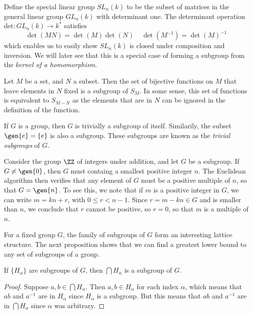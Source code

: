 \begin{example}
    Define the special linear group $SL_n(k)$ to be the subset of matrices in the general linear group $GL_n(k)$ with determinant one. The determinant operation $\text{det}: GL_n(k) \to k^*$ satisfies
    \[ \det(MN) = \det(M) \det(N)\ \ \ \ \ \det(M^{-1}) = \det(M)^{-1} \]
    which enables us to easily show $SL_n(k)$ is closed under composition and inversion. We will later see that this is a special case of forming a subgroup from the {\it kernel of a homomorphism}.
\end{example}

\begin{example}
    Let $M$ be a set, and $N$ a subset. Then the set of bijective functions on $M$ that leave elements in $N$ fixed is a subgroup of $S_M$. In some sense, this set of functions is equivalent to $S_{M - N}$ as the elements that are in $N$ can be ignored in the definition of the function.
\end{example}

\begin{example}
    If $G$ is a group, then $G$ is trivially a subgroup of itself. Similarily, the subset $\gen{e} = \{ e \}$ is also a subgroup. These subgroups are known as the \emph{trivial subgroups} of $G$.
\end{example}

\begin{example}
    Consider the group $\ZZ$ of integers under addition, and let $G$ be a subgroup. If $G \neq \gen{0}$, then $G$ must containg a smallest positive integer $n$. The Euclidean algorithm then verifies that any element of $G$ must be a positive multiple of $n$, so that $G = \gen{n}$. To see this, we note that if $m$ is a positive integer in $G$, we can write $m = kn + r$, with $0 \leq r < n-1$. Since $r = m - kn \in G$ and is smaller than $n$, we conclude that $r$ cannot be positive, so $r = 0$, so that $m$ is a multiple of $n$.
\end{example}

For a fixed group $G$, the family of subgroups of $G$ form an interesting lattice structure. The next proposition shows that we can find a greatest lower bound to any set of subgroups of a group.

\begin{prop}
    If $\{ H_\alpha \}$ are subgroups of $G$, then $\bigcap H_\alpha$ is a subgroup of $G$.
\end{prop}
\begin{proof}
    Suppose $a,b \in \bigcap H_\alpha$. Then $a,b \in H_\alpha$ for each index $\alpha$, which means that $ab$ and $a^{-1}$ are in $H_\alpha$ since $H_\alpha$ is a subgroup. But this means that $ab$ and $a^{-1}$ are in $\bigcap H_\alpha$ since $\alpha$ was arbitrary.
\end{proof}

